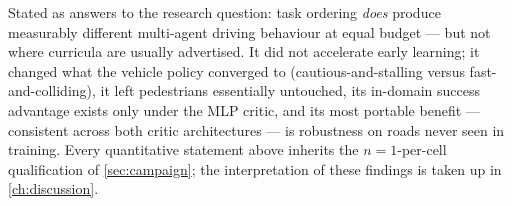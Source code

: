 Stated as answers to the research question: task ordering \emph{does}
produce measurably different multi-agent driving behaviour at equal
budget --- but not where curricula are usually advertised. It did not
accelerate early learning; it changed what the vehicle policy converged
to (cautious-and-stalling versus fast-and-colliding), it left
pedestrians essentially untouched, its in-domain success advantage
exists only under the MLP critic, and its most portable benefit ---
consistent across both critic architectures --- is robustness on roads
never seen in training. Every quantitative statement above inherits the
$n{=}1$-per-cell qualification of \cref{sec:campaign}; the
interpretation of these findings is taken up in \cref{ch:discussion}.
